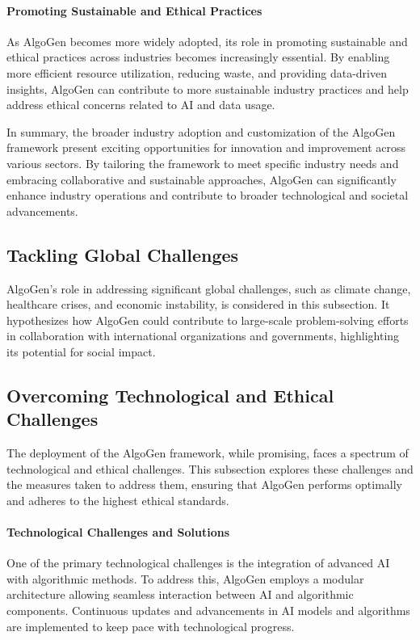 \documentclass{article}
\begin{document}
\paragraph{Promoting Sustainable and Ethical Practices}
As AlgoGen becomes more widely adopted, its role in promoting sustainable and ethical practices across industries becomes increasingly essential. By enabling more efficient resource utilization, reducing waste, and providing data-driven insights, AlgoGen can contribute to more sustainable industry practices and help address ethical concerns related to AI and data usage.

In summary, the broader industry adoption and customization of the AlgoGen framework present exciting opportunities for innovation and improvement across various sectors. By tailoring the framework to meet specific industry needs and embracing collaborative and sustainable approaches, AlgoGen can significantly enhance industry operations and contribute to broader technological and societal advancements.



\subsection{Tackling Global Challenges}
AlgoGen's role in addressing significant global challenges, such as climate change, healthcare crises, and economic instability, is considered in this subsection. It hypothesizes how AlgoGen could contribute to large-scale problem-solving efforts in collaboration with international organizations and governments, highlighting its potential for social impact.

\subsection{Overcoming Technological and Ethical Challenges}
The deployment of the AlgoGen framework, while promising, faces a spectrum of technological and ethical challenges. This subsection explores these challenges and the measures taken to address them, ensuring that AlgoGen performs optimally and adheres to the highest ethical standards.

\paragraph{Technological Challenges and Solutions}
One of the primary technological challenges is the integration of advanced AI with algorithmic methods. To address this, AlgoGen employs a modular architecture allowing seamless interaction between AI and algorithmic components. Continuous updates and advancements in AI models and algorithms are implemented to keep pace with technological progress.
\end{document}
